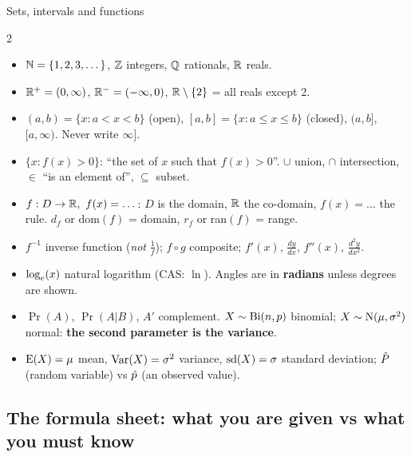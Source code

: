 \begin{defn}{Sets, intervals and functions}
\begin{multicols}{2}
\small
\begin{itemize}
  \item $\mathbb{N}=\{1,2,3,\dots\}$, $\mathbb{Z}$ integers, $\mathbb{Q}$ rationals, $\mathbb{R}$ reals.
  \item $\mathbb{R}^+=(0,\infty)$, $\mathbb{R}^-=(-\infty,0)$, $\mathbb{R}\setminus\{2\}$ = all reals except 2.
  \item $(a,b)=\{x: a<x<b\}$ (open), $[a,b]=\{x:a\le x\le b\}$ (closed), $(a,b]$, $[a,\infty)$. Never write $\infty]$.
  \item $\{x: f(x)>0\}$: ``the set of $x$ such that $f(x)>0$''. $\cup$ union, $\cap$ intersection, $\in$ ``is an element of'', $\subseteq$ subset.
  \item $f:D\to\mathbb{R},\ f(x)=\dots$: $D$ is the domain, $\mathbb{R}$ the co-domain, $f(x)=\dots$ the rule. $d_f$ or dom$(f)$ = domain, $r_f$ or ran$(f)$ = range.
  \item $f^{-1}$ inverse function (\emph{not} $\frac{1}{f}$); $f\circ g$ composite; $f'(x)$, $\frac{dy}{dx}$, $f''(x)$, $\frac{d^2y}{dx^2}$.
  \item $\log_e(x)$ natural logarithm (CAS: $\ln$). Angles are in \textbf{radians} unless degrees are shown.
  \item $\Pr(A)$, $\Pr(A|B)$, $A'$ complement. $X\sim\mathrm{Bi}(n,p)$ binomial; $X\sim\mathrm{N}(\mu,\sigma^2)$ normal: \textbf{the second parameter is the variance}.
  \item $\mathrm{E}(X)=\mu$ mean, $\mathrm{Var}(X)=\sigma^2$ variance, $\mathrm{sd}(X)=\sigma$ standard deviation; $\hat{P}$ (random variable) vs $\hat{p}$ (an observed value).
\end{itemize}
\end{multicols}
\end{defn}

\subsection{The formula sheet: what you are given vs what you must know}


